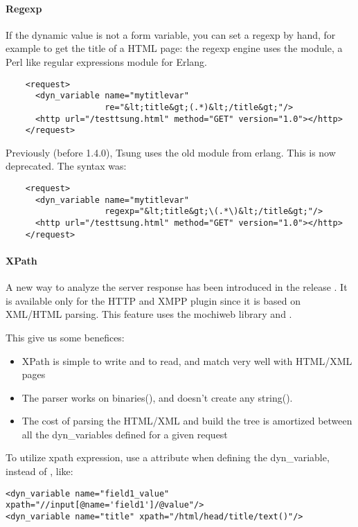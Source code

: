 \documentclass{TSUNG-en}
\begin{document}
\paragraph{Regexp}

If the dynamic value is not a form variable, you can set a regexp by
hand, for example to get the title of a HTML page: the regexp engine
uses the  module, a Perl like regular expressions module
for Erlang.

\begin{Verbatim}
    <request>
      <dyn_variable name="mytitlevar"
                    re="&lt;title&gt;(.*)&lt;/title&gt;"/>
      <http url="/testtsung.html" method="GET" version="1.0"></http>
    </request>
\end{Verbatim}


Previously (before 1.4.0), Tsung uses the old  module
from erlang. This is now deprecated. The syntax was:
\begin{Verbatim}
    <request>
      <dyn_variable name="mytitlevar"
                    regexp="&lt;title&gt;\(.*\)&lt;/title&gt;"/>
      <http url="/testtsung.html" method="GET" version="1.0"></http>
    </request>
\end{Verbatim}

\paragraph{XPath}

A new way to analyze the server response has been introduced in the
release . It is available only for the HTTP and XMPP plugin since it is
based on XML/HTML parsing. This feature uses the mochiweb library
and .

This give us some benefices:

\begin{itemize}
\item XPath is simple to write and to read, and match very well with
  HTML/XML pages
\item The parser works on binaries(), and doesn't create any
  string().
\item The cost of parsing the HTML/XML and build the tree is amortized
  between all the dyn\_variables defined for a given request
\end{itemize}

To utilize xpath expression, use a  attribute when
defining the dyn\_variable, instead of , like:
\begin{Verbatim}
<dyn_variable name="field1_value" xpath="//input[@name='field1']/@value"/>
<dyn_variable name="title" xpath="/html/head/title/text()"/>
\end{Verbatim}
\end{document}
